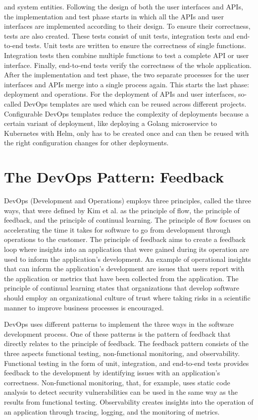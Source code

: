 and system entities. Following the design of both the user interfaces and APIs,
the implementation and test phase starts in which all the APIs and user interfaces
are implemented according to their design. To ensure their correctness,
tests are also created. These tests consist of unit tests, integration tests and end-to-end tests.
Unit tests are written to ensure the correctness of single functions.
Integration tests then combine multiple functions to test a complete API or user interface.
Finally, end-to-end tests verify the correctness of the whole application.
After the implementation and test phase, the two separate processes for the user interfaces
and APIs merge into a single process again. This starts the last phase: deployment and operations.
For the deployment of APIs and user interfaces, so-called DevOps templates are used
which can be reused across different projects. Configurable DevOps templates reduce the complexity
of deployments because a certain variant of deployment, like deploying a Golang microservice
to Kubernetes with Helm, only has to be created once and can then be reused with
the right configuration changes for other deployments.

\section{The DevOps Pattern: Feedback}
\label{sec:devops_pattern_feedback}

DevOps (Development and Operations) employs three principles, called the three ways, that were defined by Kim et al. \cite{KH+16}
as the principle of flow, the principle of feedback, and the principle of continual learning.
The principle of flow focuses on accelerating the time it takes for software
to go from development through operations to the customer.
The principle of feedback aims to create a feedback loop where insights into an application
that were gained during its operation are used to inform the application's development.
An example of operational insights that can inform the application's development
are issues that users report with the application or metrics that have been collected from the application.
The principle of continual learning states that organizations that develop software should
employ an organizational culture of trust where taking risks in a scientific manner to improve
business processes is encouraged.

DevOps uses different patterns to implement the three ways in the software development process.
One of these patterns is the pattern of feedback \cite{CM-W-DEV} that directly relates to the principle of feedback.
The feedback pattern consists of the three aspects functional testing, non-functional monitoring, and observability.
Functional testing in the form of unit, integration, and end-to-end tests provides feedback
to the development by identifying issues with an application's correctness.
Non-functional monitoring, that, for example, uses static code analysis to detect security vulnerabilities
can be used in the same way as the results from functional testing.
Observability creates insights into the operation of an application through tracing,
logging, and the monitoring of metrics.

